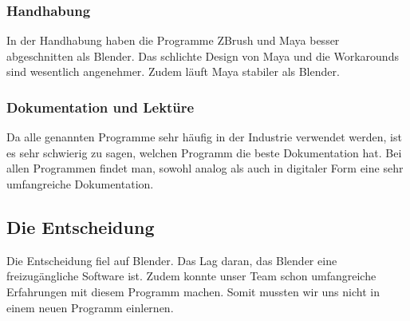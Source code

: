 \subsubsection{Handhabung}
In der Handhabung haben die Programme ZBrush und Maya besser abgeschnitten als Blender. Das schlichte Design von Maya und die Workarounds  sind wesentlich angenehmer. Zudem läuft Maya stabiler als Blender.

\subsubsection{Dokumentation und Lektüre}
Da alle genannten Programme sehr häufig in der Industrie verwendet werden, ist es sehr schwierig zu sagen, welchen Programm die beste Dokumentation hat. Bei allen Programmen findet man, sowohl analog als auch in digitaler Form eine sehr umfangreiche Dokumentation.

\subsection{Die Entscheidung}
Die Entscheidung fiel auf Blender. Das Lag daran, das Blender eine freizugängliche Software ist. Zudem konnte unser Team schon umfangreiche Erfahrungen mit diesem Programm machen. Somit mussten wir uns nicht in einem neuen Programm einlernen.